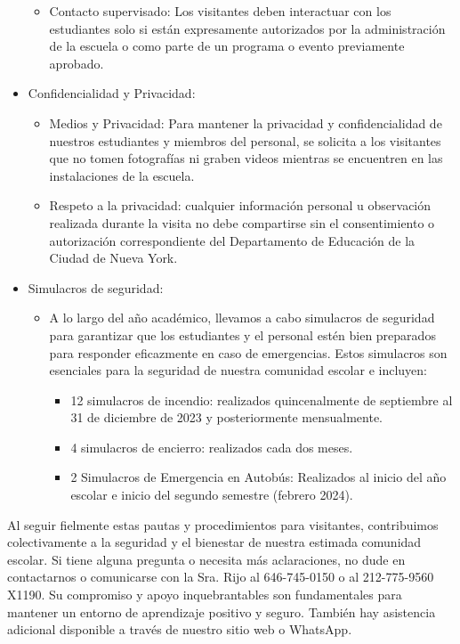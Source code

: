 \documentclass[12pt,letterpaper]{article}
\begin{document}
\begin{itemize}
\begin{itemize}
		\item Contacto supervisado: Los visitantes deben interactuar con los estudiantes solo si están expresamente autorizados por la administración de la escuela o como parte de un programa o evento previamente aprobado.
		\end{itemize}
	\item Confidencialidad y Privacidad:
		\begin{itemize}
		\item Medios y Privacidad: Para mantener la privacidad y confidencialidad de nuestros estudiantes y miembros del personal, se solicita a los visitantes que no tomen fotografías ni graben videos mientras se encuentren en las instalaciones de la escuela.
		\item Respeto a la privacidad: cualquier información personal u observación realizada durante la visita no debe compartirse sin el consentimiento o autorización correspondiente del Departamento de Educación de la Ciudad de Nueva York.
		\end{itemize}
	\item Simulacros de seguridad:
		\begin{itemize}
		\item A lo largo del año académico, llevamos a cabo simulacros de seguridad para garantizar que los estudiantes y el personal estén bien preparados para responder eficazmente en caso de emergencias. Estos simulacros son esenciales para la seguridad de nuestra comunidad escolar e incluyen:
			\begin{itemize}
			\item 12 simulacros de incendio: realizados quincenalmente de septiembre al 31 de diciembre de 2023 y posteriormente mensualmente.
			\pagebreak
\vspace*{1.5cm}
			\item 4 simulacros de encierro: realizados cada dos meses.
			\item 2 Simulacros de Emergencia en Autobús: Realizados al inicio del año escolar e inicio del segundo semestre (febrero 2024).
			\end{itemize}
		\end{itemize}
\end{itemize}

Al seguir fielmente estas pautas y procedimientos para visitantes, contribuimos colectivamente a la seguridad y el bienestar de nuestra estimada comunidad escolar. Si tiene alguna pregunta o necesita más aclaraciones, no dude en contactarnos o comunicarse con la Sra. Rijo al 646-745-0150 o al 212-775-9560 X1190. Su compromiso y apoyo inquebrantables son fundamentales para mantener un entorno de aprendizaje positivo y seguro. También hay asistencia adicional disponible a través de nuestro sitio web o WhatsApp.
\end{document}
